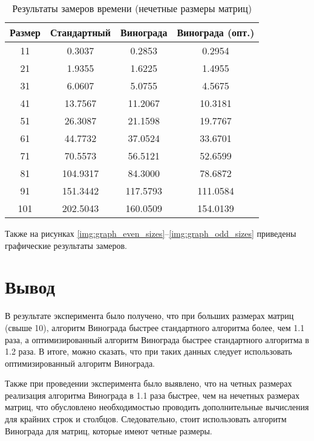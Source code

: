 \begin{table}[h]
    \begin{center}
        \begin{threeparttable}
        \captionsetup{justification=raggedright,singlelinecheck=off}
        \caption{Результаты замеров времени (нечетные размеры матриц)}
        \label{tbl:time_mes_odd}
        \begin{tabular}{|c|c|c|c|}
            \hline
            Размер & Стандартный & Винограда & Винограда (опт.) \\
            \hline
            11 & 0.3037 & 0.2853 & 0.2954 \\
            \hline
            21 & 1.9355 & 1.6225 & 1.4955 \\
            \hline
            31 & 6.0607 & 5.0755 & 4.5675 \\
            \hline
            41 & 13.7567 & 11.2067 & 10.3181 \\
            \hline
            51 & 26.3087 & 21.1598 & 19.7767 \\
            \hline
            61 & 44.7732 & 37.0524 & 33.6701 \\
            \hline
            71 & 70.5573 & 56.5121 & 52.6599 \\
            \hline
            81 & 104.9317 & 84.3000 & 78.6872 \\
            \hline
            91 & 151.3442 & 117.5793 & 111.0584 \\
            \hline
            101 & 202.5043 & 160.0509 & 154.0139 \\
            \hline
		\end{tabular}
    \end{threeparttable}
\end{center}
\end{table}

Также на рисунках \ref{img:graph_even_sizes}--\ref{img:graph_odd_sizes} приведены графические результаты замеров.

\clearpage


\section{Вывод}

В результате эксперимента было получено, что при больших размерах матриц (свыше 10), алгоритм Винограда быстрее стандартного алгоритма более, чем 1.1 раза, а оптимизированный алгоритм Винограда быстрее стандартного алгоритма в 1.2 раза. В итоге, можно сказать, что при таких данных следует использовать оптимизированный алгоритм Винограда.

Также при проведении эксперимента было выявлено, что на четных размерах реализация алгоритма Винограда в 1.1 раза быстрее, чем на нечетных размерах матриц, что обусловлено необходимостью проводить дополнительные вычисления для крайних строк и столбцов.  Следовательно, стоит использовать алгоритм Винограда для матриц, которые имеют четные размеры.
